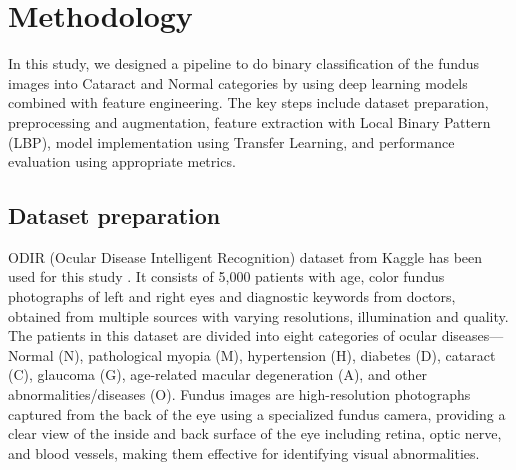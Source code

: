 \documentclass{ijclclp}
\begin{document}
\section{Methodology}\label{sec:method}
\justifying
In this study, we designed a pipeline to do binary classification of the fundus images into Cataract and Normal categories by using deep learning models combined with feature engineering. The key steps include dataset preparation, preprocessing and augmentation, feature extraction with Local Binary Pattern (LBP), model implementation using Transfer Learning, and performance evaluation using appropriate metrics.

\subsection{Dataset preparation}
\vspace{1em}
ODIR (Ocular Disease Intelligent Recognition) dataset from Kaggle has been used for this study \cite{odir5k}. It consists of 5,000 patients with age, color fundus photographs of left and right eyes and diagnostic keywords from doctors, obtained from multiple sources with varying resolutions, illumination and quality. The patients in this dataset are divided into eight categories of ocular diseases—Normal (N), pathological myopia (M), hypertension (H), diabetes (D), cataract (C), glaucoma (G), age-related macular degeneration (A), and other abnormalities/diseases (O). Fundus images are high-resolution photographs captured from the back of the eye using a specialized fundus camera, providing a clear view of the inside and back surface of the eye including retina, optic nerve, and blood vessels, making them effective for identifying visual abnormalities.
\end{document}
